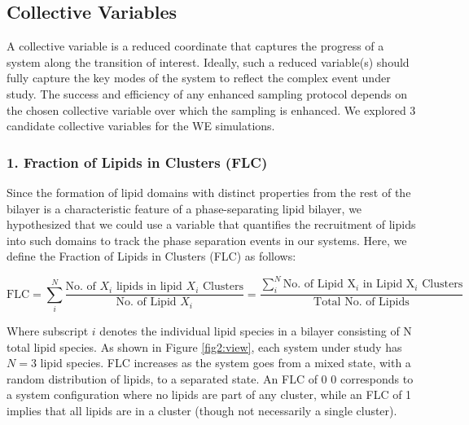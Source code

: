 \documentclass{biophys-new}
\begin{document}
\subsection*{Collective Variables}

A collective variable is a reduced coordinate that captures the progress of a system along the transition of interest.
Ideally, such a reduced variable(s) should fully capture the key modes of the system to reflect the complex event under study.
The success and efficiency of any enhanced sampling protocol depends on the chosen collective variable over which the sampling is enhanced\cite{Valsson2016, Yang2019b, Henin2022}. 
We explored 3 candidate collective variables for the WE simulations.

\subsubsection*{1. Fraction of Lipids in Clusters (FLC)}
Since the formation of lipid domains with distinct properties from the rest of the bilayer is a characteristic feature of a phase-separating lipid bilayer,
we hypothesized that we could use a variable that quantifies the recruitment of lipids into such domains to track the phase separation events in our systems.
Here, we define the Fraction of Lipids in Clusters (FLC) as follows:

\begin{equation}
\label{eq:CLT}
\text{FLC} = \sum_{i}^{N} \frac{\text{No. of $X_i$ lipids in lipid $X_i$ Clusters}}{\text{No. of Lipid $X_i$}} =  \frac{\sum_{i}^{N} \text{No. of Lipid X$_i$ in Lipid X$_i$ Clusters}}{\text{Total No. of Lipids}}
\end{equation}

\noindent Where subscript $i$ denotes the individual lipid species in a bilayer consisting of N total lipid species.
As shown in Figure \ref{fig2:view}, each system under study has $N=3$ lipid species.
FLC increases as the system goes from a mixed state, with a random distribution of lipids, to a separated state.
An FLC of 0
0 corresponds to a system configuration where no lipids are part of any cluster,
while an FLC of 1 implies that all lipids are in a cluster (though not necessarily a single cluster).
\end{document}
